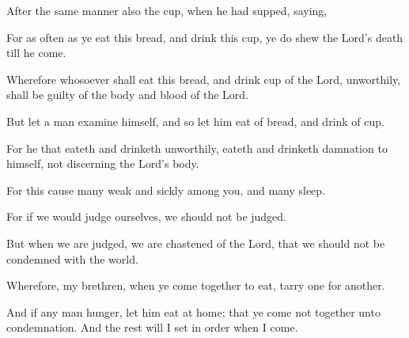 {After the same
manner
also
{} the
cup,
when he had
supped,
saying,
{}

For as often
as ye
eat
this
bread,
and
drink
this
cup, ye do
shew the
Lord’s
death
till he
come.

Wherefore
whosoever shall
eat
this
bread,
and
drink
{}
cup of the
Lord,
unworthily, shall
be guilty
of the
body
and
blood of the
Lord.

But
let a
man
examine
himself,
and
so let him
eat
of
{}
bread,
and
drink
of
{}
cup.

For
he that
eateth
and
drinketh
unworthily,
eateth
and
drinketh
damnation to
himself,
not
discerning the
Lord’s
body.

For this
cause
many
{}
weak
and
sickly
among
you,
and
many
sleep.

For
if we would
judge
ourselves, we
should
not be
judged.

But when we are
judged, we are
chastened
of the
Lord,
that we
should
not be
condemned
with the
world.

Wherefore,
my
brethren, when ye come
together
to
eat, tarry
one for
another.

And
if any
man
hunger, let him
eat
at
home;
that ye
come
not
together
unto
condemnation.
And the
rest will I set in
order
when I
come.




\par }
